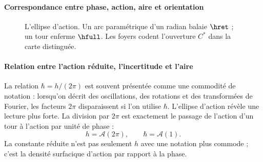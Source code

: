 \paragraph{Correspondance entre phase, action, aire et orientation}

\begin{figure}[H]
\centering
{}
\caption{L'ellipse d'action. Un arc paramétrique d'un radian balaie
\(\hret\) ; un tour enferme \(\hfull\). Les foyers codent l'ouverture
\(C^*\) dans la carte distinguée.}
\label{fig:elipse-accion}
\end{figure}

\paragraph{Relation entre l'action réduite, l'incertitude et l'aire}

La relation \(\hbar=h/(2\pi)\) est souvent présentée comme une commodité
de notation : lorsqu'on décrit des oscillations, des rotations et des transformées de Fourier,
les facteurs \(2\pi\) disparaissent si l'on utilise \(\hbar\). L'ellipse d'action
révèle une lecture plus forte. La division par \(2\pi\) est exactement le
passage de l'action d'un tour à l'action par unité de phase :
\[
h=\mathcal A(2\pi),\qquad \hbar=\mathcal A(1).
\]
La constante réduite n'est pas seulement \(h\) avec une notation plus commode ; c'est la
densité surfacique d'action par rapport à la phase.


